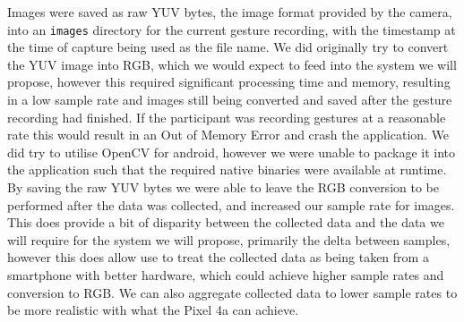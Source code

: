 Images were saved as raw YUV bytes, the image format provided by the camera, into an \verb|images| directory for the current gesture recording, with the timestamp at the time of capture being used as the file name.
We did originally try to convert the YUV image into RGB, which we would expect to feed into the system we will propose, however this required significant processing time and memory, resulting in a low sample rate and images still being converted and saved after the gesture recording had finished. If the participant was recording gestures at a reasonable rate this would result in an Out of Memory Error and crash the application.
We did try to utilise OpenCV for android, however we were unable to package it into the application such that the required native binaries were available at runtime.
By saving the raw YUV bytes we were able to leave the RGB conversion to be performed after the data was collected, and increased our sample rate for images. This does provide a bit of disparity between the collected data and the data we will require for the system we will propose, primarily the delta between samples, however this does allow use to treat the collected data as being taken from a smartphone with better hardware, which could achieve higher sample rates and conversion to RGB. We can also aggregate collected data to lower sample rates to be more realistic with what the Pixel 4a can achieve.
